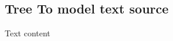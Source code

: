 \newpage
\hypertarget{treeToModel tex}{}
\subsection{Tree To model text source}
\texHeader

Text content
